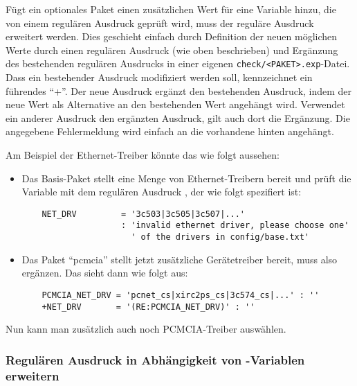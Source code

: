 Fügt ein optionales Paket einen zusätzlichen Wert für eine Variable
hinzu, die von einem regulären Ausdruck geprüft wird, muss der reguläre
Ausdruck erweitert werden. Dies geschieht einfach durch Definition der
neuen möglichen Werte durch einen regulären Ausdruck (wie oben
beschrieben) und Ergänzung des bestehenden regulären Ausdrucks in
einer eigenen \texttt{check/<PAKET>.exp}-Datei. Dass ein bestehender
Ausdruck modifiziert werden soll, kennzeichnet ein führendes "`+"'.
Der neue Ausdruck ergänzt den bestehenden Ausdruck, indem der neue Wert
als Alternative an den bestehenden Wert angehängt wird. Verwendet ein
anderer Ausdruck den ergänzten Ausdruck, gilt auch dort die Ergänzung.
Die angegebene Fehlermeldung wird einfach an die vorhandene hinten angehängt.

Am Beispiel der Ethernet-Treiber könnte das wie folgt aussehen:

\begin{itemize}
\item Das Basis-Paket stellt eine Menge von Ethernet-Treibern bereit
  und prüft die Variable  mit dem regulären Ausdruck ,
  der wie folgt spezifiert ist:

\begin{example}
\begin{verbatim}
    NET_DRV         = '3c503|3c505|3c507|...'
                    : 'invalid ethernet driver, please choose one'
                      ' of the drivers in config/base.txt'
\end{verbatim}
\end{example}
\item Das Paket "`pcmcia"' stellt jetzt zusätzliche Gerätetreiber bereit,
  muss also  ergänzen. Das sieht dann wie folgt aus:

\begin{example}
\begin{verbatim}
    PCMCIA_NET_DRV = 'pcnet_cs|xirc2ps_cs|3c574_cs|...' : ''
    +NET_DRV       = '(RE:PCMCIA_NET_DRV)' : ''
\end{verbatim}
\end{example}
\end{itemize}

Nun kann man zusätzlich auch noch PCMCIA-Treiber auswählen.


\subsubsection{Regulären Ausdruck in Abhängigkeit von -Variablen erweitern}

